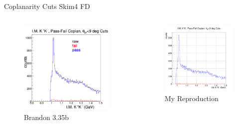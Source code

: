 \documentclass[aspectratio=169]{beamer}
\begin{document}
\begin{frame}{Coplanarity Cuts \hfill Skim4 FD}
\vspace*{-0.6cm}
    \begin{columns}
    \begin{figure}
        \centering
        \includegraphics[width=0.94\textwidth]{brandon_figs/35b.png}
        \caption{Brandon 3.35b}
    \end{figure}
    \begin{figure}
        \centering
        \includegraphics[width=0.97\textwidth]{pdfs/35b.png}
        \caption{My Reproduction}
    \end{figure}
    \end{columns}
\end{frame}
\end{document}
